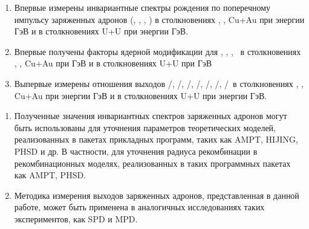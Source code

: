 {\novelty}
\begin{enumerate}[beginpenalty=10000] %
	\item Впервые измерены инвариантные спектры рождения по поперечному импульсу заряженных адронов (\pipm, \Kpm, \prot, \aprot) в столкновениях  \pal, \heau, Cu+Au при энергии  ГэВ и в столкновениях U+U при энергии  ГэВ.
	\item Впервые получены факторы ядерной модификации для \pipm, \Kpm, \prot, \aprot\, в столкновениях  \pal, \heau, Cu+Au при  ГэВ и в столкновениях U+U при  ГэВ
	\item 	Выпервые измерены отношения выходов \pim/\pip, \Km/\Kp, \prot/\aprot, \prot/\pip, \aprot/\pim, \Kp/\pip, \Km/\pim\,  в столкновениях  \pal, \heau, Cu+Au при энергии  ГэВ и в столкновениях U+U при энергии  ГэВ.
\end{enumerate}

{\influence}
\begin{enumerate}[beginpenalty=10000] %
	\item Полученные значения инвариантных спектров заряженных адронов могут быть использованы для уточнения параметров теоретических моделей, реализованных в пакетах прикладных программ, таких как  AMPT, HIJING, PHSD и др. В частности, для уточнения радиуса рекомбинации в рекомбинационных моделях, реализованных в таких программных пакетах как AMPT, PHSD.
	\item Методика измерения выходов заряженных адронов, представленная в данной работе, может быть применена в аналогичных исследованиях таких экспериментов, как SPD и MPD.
	
\end{enumerate}



